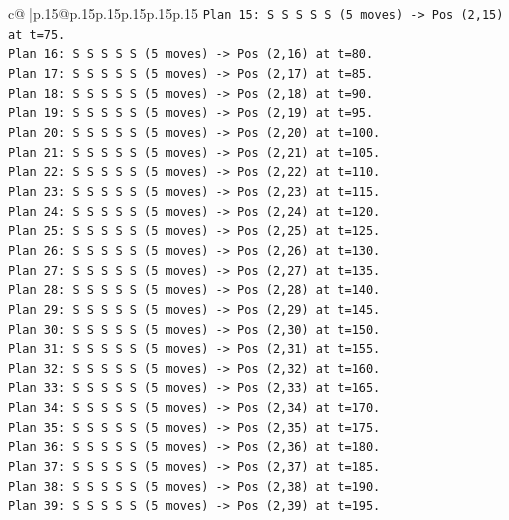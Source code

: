 \documentclass{article}
\begin{document}
{\begin{supertabular}{c@{$\;$}|p{.15\linewidth}@{}p{.15\linewidth}p{.15\linewidth}p{.15\linewidth}p{.15\linewidth}p{.15\linewidth}}
{{{\texttt{Plan 15: S S S S S (5 moves) {-}> Pos (2,15) at t=75.} \\
\texttt{Plan 16: S S S S S (5 moves) {-}> Pos (2,16) at t=80.} \\
\texttt{Plan 17: S S S S S (5 moves) {-}> Pos (2,17) at t=85.} \\
\texttt{Plan 18: S S S S S (5 moves) {-}> Pos (2,18) at t=90.} \\
\texttt{Plan 19: S S S S S (5 moves) {-}> Pos (2,19) at t=95.} \\
\texttt{Plan 20: S S S S S (5 moves) {-}> Pos (2,20) at t=100.} \\
\texttt{Plan 21: S S S S S (5 moves) {-}> Pos (2,21) at t=105.} \\
\texttt{Plan 22: S S S S S (5 moves) {-}> Pos (2,22) at t=110.} \\
\texttt{Plan 23: S S S S S (5 moves) {-}> Pos (2,23) at t=115.} \\
\texttt{Plan 24: S S S S S (5 moves) {-}> Pos (2,24) at t=120.} \\
\texttt{Plan 25: S S S S S (5 moves) {-}> Pos (2,25) at t=125.} \\
\texttt{Plan 26: S S S S S (5 moves) {-}> Pos (2,26) at t=130.} \\
\texttt{Plan 27: S S S S S (5 moves) {-}> Pos (2,27) at t=135.} \\
\texttt{Plan 28: S S S S S (5 moves) {-}> Pos (2,28) at t=140.} \\
\texttt{Plan 29: S S S S S (5 moves) {-}> Pos (2,29) at t=145.} \\
\texttt{Plan 30: S S S S S (5 moves) {-}> Pos (2,30) at t=150.} \\
\texttt{Plan 31: S S S S S (5 moves) {-}> Pos (2,31) at t=155.} \\
\texttt{Plan 32: S S S S S (5 moves) {-}> Pos (2,32) at t=160.} \\
\texttt{Plan 33: S S S S S (5 moves) {-}> Pos (2,33) at t=165.} \\
\texttt{Plan 34: S S S S S (5 moves) {-}> Pos (2,34) at t=170.} \\
\texttt{Plan 35: S S S S S (5 moves) {-}> Pos (2,35) at t=175.} \\
\texttt{Plan 36: S S S S S (5 moves) {-}> Pos (2,36) at t=180.} \\
\texttt{Plan 37: S S S S S (5 moves) {-}> Pos (2,37) at t=185.} \\
\texttt{Plan 38: S S S S S (5 moves) {-}> Pos (2,38) at t=190.} \\
\texttt{Plan 39: S S S S S (5 moves) {-}> Pos (2,39) at t=195.} \\
}}}
\end{supertabular}}
\end{document}
